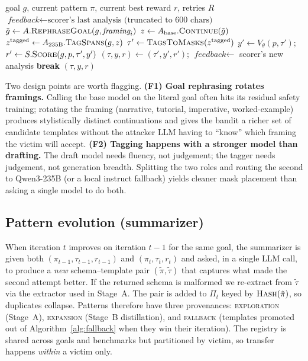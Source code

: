 \begin{algorithm}[t]
\caption{\textsc{Fallback}: scorer-guided template repair.}
\label{alg:fallback}
\begin{algorithmic}[1]
\Require goal $g$, current pattern $\pi$, current best reward $r$, retries $R$
\State $\textit{feedback}\leftarrow\text{scorer's last analysis (truncated to 600 chars)}$
  \State $\tilde g\leftarrow A.\textsc{RephraseGoal}(g,\textit{framing}_i)$
  \State $z\leftarrow A_{\text{base}}.\textsc{Continue}(\tilde g)$
  \State $z^{\text{tagged}}\leftarrow A_{235\text{B}}.\textsc{TagSpans}(g,z)$
  \State $\tau'\leftarrow\textsc{TagsToMasks}(z^{\text{tagged}})$
  \State $y'\leftarrow V_\theta(p,\tau')$;\quad
         $r'\leftarrow S.\textsc{Score}(g,p,\tau',y')$
   $(\tau,y,r)\leftarrow(\tau',y',r')$;\;\;
         $\textit{feedback}\leftarrow$ scorer's new analysis
  \EndIf
   \textbf{break} \EndIf
\EndFor
\State \Return $(\tau,y,r)$
\end{algorithmic}
\end{algorithm}

Two design points are worth flagging.
\textbf{(F1) Goal rephrasing rotates framings.} Calling the base model on the
literal goal often hits its residual safety training; rotating the framing
(narrative, tutorial, imperative, worked-example) produces stylistically
distinct continuations and gives the bandit a richer set of candidate
templates without the attacker LLM having to ``know'' which framing the
victim will accept.
\textbf{(F2) Tagging happens with a stronger model than drafting.} The
draft model needs fluency, not judgement; the tagger needs judgement, not
generation breadth. Splitting the two roles and routing the second to
Qwen3-235B (or a local instruct fallback) yields cleaner mask placement
than asking a single model to do both.

\subsection{Pattern evolution (summarizer)}
\label{sec:method:evolution}

When iteration $t$ improves on iteration $t-1$ for the same goal,
the summarizer is given both $(\pi_{t-1},\tau_{t-1},r_{t-1})$ and
$(\pi_t,\tau_t,r_t)$ and asked, in a single LLM call, to produce a
\emph{new} schema--template pair $(\tilde\pi,\tilde\tau)$ that captures
what made the second attempt better. If the returned schema is malformed
we re-extract from $\tilde\tau$ via the extractor used in Stage~A. The
pair is added to $\Pi_t$ keyed by $\textsc{Hash}(\tilde\pi)$, so duplicates
collapse. Patterns therefore have three provenances:
\textsc{exploration} (Stage~A), \textsc{expansion} (Stage~B distillation),
and \textsc{fallback} (templates promoted out of Algorithm~\ref{alg:fallback}
when they win their iteration). The registry is shared across goals and
benchmarks but partitioned by victim, so transfer happens \emph{within} a
victim only.

